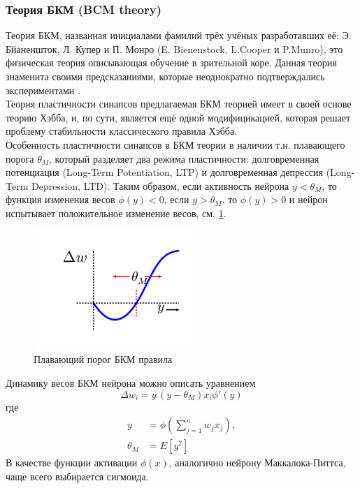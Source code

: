 \documentclass[a4paper,10pt]{article}
\begin{document}
\subsubsection{Теория БКМ (BCM theory)}
\indent Теория БКМ, названная инициалами фамилий трёх учёных разработавших её: Э. Бйаненшток, Л. Купер и П. Монро (E. Bienenstock, L.Cooper и P.Munro), это физическая теория описывающая обучение в зрительной коре. Данная теория знаменита своими предсказаниями, которые неоднократно подтверждались экспериментами \cite{Cooper}.\\
\indent Теория пластичности синапсов предлагаемая БКМ теорией имеет в своей основе теорию Хэбба, и, по сути, является ещё одной модифицикацией, которая решает проблему стабильности классического правила Хэбба.\\
\indent Особенность пластичности синапсов в БКМ теории в наличии т.н. плавающего порога $\theta_{M}$, который разделяет два режима пластичности: долговременная потенциация (Long-Term Potentiation, LTP) и долговременная депрессия (Long-Term Depression, LTD). Таким образом, если активность нейрона $y<\theta_{M}$, то функция изменения весов $\phi(y)<0$, если $y>\theta_{M}$, то $\phi(y)>0$ и нейрон испытывает положительное изменение весов, см. \ref{bcm_pic}.
\begin{figure}[ht]
\centering
\captionsetup{justification=centering,margin=1cm}
\includegraphics[width=60mm,scale=0.2]{bcm.png}
\caption{Плавающий порог БКМ правила}
\label{bcm_pic}
\end{figure}
\FloatBarrier
\indent Динамику весов БКМ нейрона можно описать уравнением
\begin{equation}
\Delta w_{i} = y\,(y - \theta_{M})x_{i}\phi'(y)
\end{equation}
где
\begin{equation}
\begin{split}
y &= \phi(\sum_{j=1}^{n}w_{j}x_{j}),\\
\theta_{M} &= E[y^2]
\end{split}	
\end{equation}
\indent В качестве функции активации $\phi(x)$, аналогично нейрону Маккалока-Питтса, чаще всего выбирается сигмоида.\\ 
\end{document}
